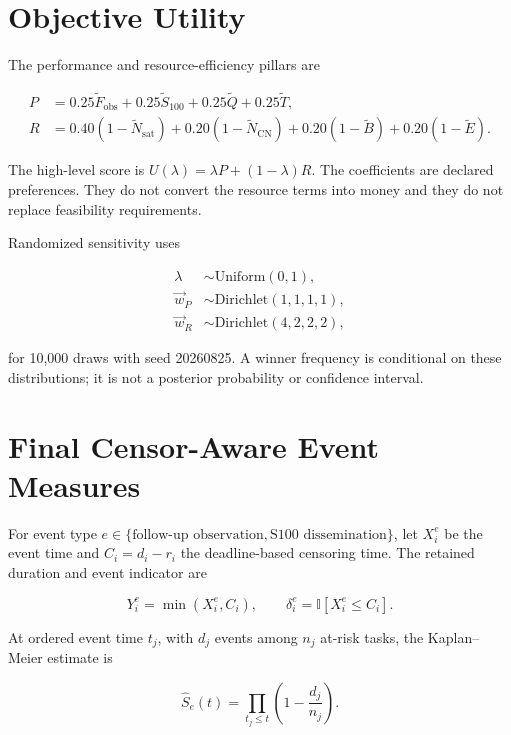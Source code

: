 \section{Objective Utility}

The performance and resource-efficiency pillars are

\begin{align}
P &= 0.25\widetilde F_{\mathrm{obs}}+0.25\widetilde S_{100}
+0.25\widetilde Q+0.25\widetilde T,\\
R &= 0.40(1-\widetilde N_{\mathrm{sat}})+0.20(1-\widetilde N_{\mathrm{CN}})
+0.20(1-\widetilde B)+0.20(1-\widetilde E).
\end{align}

The high-level score is $U(\lambda)=\lambda P+(1-\lambda)R$. The coefficients are declared preferences. They do not convert the resource terms into money and they do not replace feasibility requirements.

Randomized sensitivity uses

\begin{align}
\lambda &\sim \mathrm{Uniform}(0,1),\\
\vec{w}_{P} &\sim \mathrm{Dirichlet}(1,1,1,1),\\
\vec{w}_{R} &\sim \mathrm{Dirichlet}(4,2,2,2),
\end{align}

for 10,000 draws with seed 20260825. A winner frequency is conditional on these distributions; it is not a posterior probability or confidence interval.

\section{Final Censor-Aware Event Measures}

For event type $e\in\{\text{follow-up observation},\text{S100 dissemination}\}$, let $X_i^e$ be the event time and $C_i=d_i-r_i$ the deadline-based censoring time. The retained duration and event indicator are

\begin{equation}
Y_i^e=\min(X_i^e,C_i),\qquad
\delta_i^e=\mathbb{I}[X_i^e\le C_i].
\end{equation}

At ordered event time $t_j$, with $d_j$ events among $n_j$ at-risk tasks, the Kaplan--Meier estimate is

\begin{equation}
\widehat S_e(t)=\prod_{t_j\le t}\left(1-\frac{d_j}{n_j}\right).
\end{equation}

